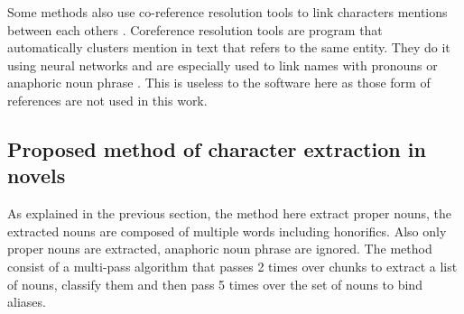 \documentclass[a4paper, 12pt]{report}
\begin{document}
Some methods also use co-reference resolution tools to link characters mentions between each others \citep{character_meta}. Coreference resolution tools are program that automatically clusters mention in text that refers to the same entity. They do it using neural networks and are especially used to link names with pronouns or anaphoric noun phrase \citep{coref_deep, coref_deep2} . This is useless to the software here as those form of references are not used in this work. \\

\subsection{Proposed method of character extraction in novels}
As explained in the previous section, the method here extract proper nouns, the extracted nouns are composed of multiple words including honorifics. Also only proper nouns are extracted, anaphoric noun phrase are ignored. The method consist of a multi-pass algorithm that passes 2 times over chunks to extract a list of nouns,  classify them and then pass 5 times over the set of nouns to bind aliases.
\end{document}
